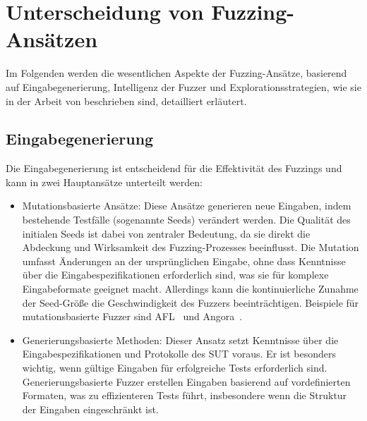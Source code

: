
\section{Unterscheidung von Fuzzing-Ansätzen}\label{sec:unterscheidung-von-fuzzern}
Im Folgenden werden die wesentlichen Aspekte der Fuzzing-Ansätze, basierend auf Eingabegenerierung, Intelligenz der Fuzzer
und Explorationsstrategien, wie sie in der Arbeit von \citet{eceiza_fuzzing_2021} beschrieben sind, detailliert erläutert.
\subsection{Eingabegenerierung}\label{subsec:input-generation}
Die Eingabegenerierung ist entscheidend für die Effektivität des Fuzzings und kann in zwei Hauptansätze unterteilt werden:
\begin{itemize}
    \item Mutationsbasierte Ansätze: Diese Ansätze generieren neue Eingaben, indem bestehende Testfälle (sogenannte Seeds) 
    verändert werden. 
    Die Qualität des initialen Seeds ist dabei von zentraler Bedeutung, da sie direkt die Abdeckung und Wirksamkeit des 
    Fuzzing-Prozesses beeinflusst. 
    Die Mutation umfasst Änderungen an der ursprünglichen Eingabe, ohne dass Kenntnisse über die Eingabespezifikationen 
    erforderlich sind, was sie für komplexe Eingabeformate geeignet macht. 
    Allerdings kann die kontinuierliche Zunahme der Seed-Größe die Geschwindigkeit des Fuzzers beeinträchtigen. 
    Beispiele für mutationsbasierte Fuzzer sind AFL~\cite{afl} und Angora~\cite{chen_angora_2018}.
    \item Generierungsbasierte Methoden: Dieser Ansatz setzt Kenntnisse über die Eingabespezifikationen und Protokolle 
    des SUT voraus.
    Er ist besonders wichtig, wenn gültige Eingaben für erfolgreiche Tests erforderlich sind. 
    Generierungsbasierte Fuzzer erstellen Eingaben basierend auf vordefinierten Formaten, was zu effizienteren Tests führt, 
    insbesondere wenn die Struktur der Eingaben eingeschränkt ist.
\end{itemize}
